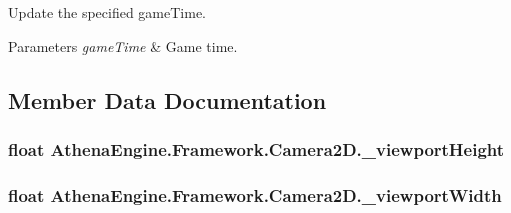 Update the specified game\-Time. 


\begin{DoxyParams}{Parameters}
{\em game\-Time} & Game time. \\
\hline
\end{DoxyParams}


\subsection{Member Data Documentation}
\hypertarget{class_athena_engine_1_1_framework_1_1_camera2_d_a485bfef4ff5f718addc49d3eec88b0e7}{
\subsubsection[{\-\_\-viewport\-Height}]{\setlength{\rightskip}{0pt plus 5cm}float Athena\-Engine.\-Framework.\-Camera2\-D.\-\_\-viewport\-Height\hspace{0.3cm}{\ttfamily [protected]}}}\label{class_athena_engine_1_1_framework_1_1_camera2_d_a485bfef4ff5f718addc49d3eec88b0e7}
\hypertarget{class_athena_engine_1_1_framework_1_1_camera2_d_af7ec19f2874045d548709d58f8778dd9}{
\subsubsection[{\-\_\-viewport\-Width}]{\setlength{\rightskip}{0pt plus 5cm}float Athena\-Engine.\-Framework.\-Camera2\-D.\-\_\-viewport\-Width\hspace{0.3cm}{\ttfamily [protected]}}}\label{class_athena_engine_1_1_framework_1_1_camera2_d_af7ec19f2874045d548709d58f8778dd9}


